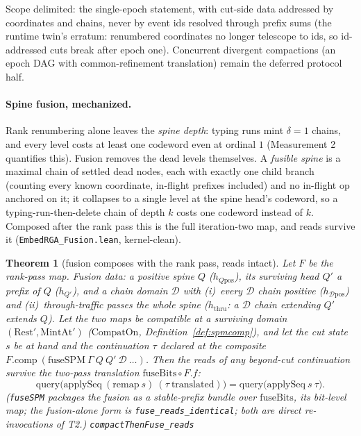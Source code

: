 \documentclass[11pt]{article}
\newtheorem{theorem}{Theorem}[section]
\newcommand{\lean}[1]{\texttt{#1}}
\newcommand{\code}[1]{\texttt{#1}}
\begin{document}
\noindent Scope
delimited: the single-epoch statement, with cut-side data addressed by
coordinates and chains, never by event ids resolved through prefix sums
(the runtime twin's erratum: renumbered coordinates no longer telescope
to ids, so id-addressed cuts break after epoch one). Concurrent
divergent compactions (an epoch DAG with common-refinement translation)
remain the deferred protocol half.

\paragraph{Spine fusion, mechanized.} Rank renumbering alone leaves the
\emph{spine depth}: typing runs mint $\delta{=}1$ chains, and every level
costs at least one codeword even at ordinal $1$ (Measurement 2 quantifies
this). Fusion removes the dead levels themselves. A \emph{fusible spine}
is a maximal chain of settled dead nodes, each with exactly one child
branch (counting every known coordinate, in-flight prefixes included) and
no in-flight op anchored on it; it collapses to a single level at the
spine head's codeword, so a typing-run-then-delete chain of depth $k$
costs one codeword instead of $k$. Composed after the rank pass this is
the full iteration-two map, and reads survive it
(\code{EmbedRGA\_Fusion.lean}, kernel-clean).

\begin{theorem}[fusion composes with the rank pass, reads intact]
\label{thm:fusereads}
Let $F$ be the rank-pass map. Fusion data: a positive spine $Q$
($h_{Q\mathrm{pos}}$), its surviving head $Q'$ a prefix of $Q$
($h_{Q'}$), and a chain domain $\mathcal{D}$ with (i)~every
$\mathcal{D}$ chain positive ($h_{\mathcal{D}\mathrm{pos}}$) and
(ii)~\emph{through-traffic passes the whole spine} ($h_{\mathrm{thru}}$:
a $\mathcal{D}$ chain extending $Q'$ extends $Q$). Let the two maps be
compatible at a surviving domain $(\mathrm{Rest}', \mathrm{MintAt}')$
($\mathrm{CompatOn}$, Definition~\ref{def:spmcomp}), and let the cut
state $s$ be at hand and the continuation $\tau$ declared at the
\emph{composite} $F.\mathrm{comp}\ (\mathrm{fuseSPM}\ \Gamma\ Q\ Q'\
\mathcal{D}\ \ldots)$. Then the reads of any beyond-cut continuation
survive the two-pass translation $\mathrm{fuseBits} \circ F.f$:
\[
  \mathrm{query}\bigl(\mathrm{applySeq}\
  (\mathrm{remap}\ s)\ (\tau\ \text{translated})\bigr)
  = \mathrm{query}\bigl(\mathrm{applySeq}\ s\ \tau\bigr).
\]
(\lean{fuseSPM} packages the fusion as a stable-prefix bundle over
$\mathrm{fuseBits}$, its bit-level map; the fusion-alone form is
\lean{fuse\_reads\_identical}; both are direct re-invocations of T2.)
\hfill\lean{compactThenFuse\_reads}
\end{theorem}
\end{document}
